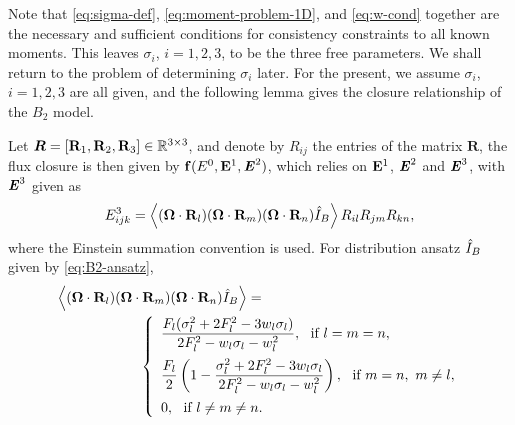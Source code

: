 Note that \eqref{eq:sigma-def}, \eqref{eq:moment-problem-1D}, and
\eqref{eq:w-cond} together are the necessary and sufficient conditions 
for consistency constraints to all known
moments. This leaves $\sigma_i$, $i=1,2,3$, to be the three free
parameters. We shall return to the problem of determining $\sigma_i$
later. For the present, we assume $\sigma_i$, $i = 1,2,3$ are all given, and the
following lemma gives the closure relationship of the $B_2$ model.
\begin{lemma}\label{lem:E3}
  Let
  $\mathrm{\boldsymbol{R}} = [\mathbf{R}_1, \mathbf{R}_2, \mathbf{R}_3] \in \mathbb{R}^{3\times
    3}$,
  and denote by $R_{ij}$ the entries of the matrix
  $\mathrm{\boldsymbol{R}}$, the flux closure is then given by
  $\mathbf{f}(E^0, \mathbf{E}^1, \boldsymbol{\mathit{E}}^2)$, which relies on $\mathbf{E}^1$, $\boldsymbol{\mathit{E}}^2$ and
  $\boldsymbol{\mathit{E}}^3$, with $\boldsymbol{\mathit{E}}^3$ given as
\[
E^3_{ijk} =   \left\langle  (\boldsymbol{\Omega}\cdot\mathbf{R}_l)
  (\boldsymbol{\Omega}\cdot\mathbf{R}_m)
  (\boldsymbol{\Omega}\cdot\mathbf{R}_n) \hat I_B \right\rangle
R_{il} R_{jm} R_{kn},
\]
where the Einstein summation convention is used.
  For distribution ansatz $\hat I_B$ given by \eqref{eq:B2-ansatz},
  \begin{equation}\label{eq:B2-closure}
    \begin{aligned}
      &\Vint{ (\bOmega\cdot\bR_l) (\bOmega\cdot\bR_m)
    (\bOmega\cdot\bR_n) \bansatz} = \\ & \qquad \qquad \qquad \left
      \{
        \begin{array}{l}
          \dfrac{ F_l (\sigma_l^2 
          + 2 F_l^2 - 3 w_l \sigma_l)}
          {2 F_l^2 - w_l \sigma_l - w_l^2},
          ~~\text{if } l = m = n,\\ [4mm]
          \dfrac{ F_l }{2}\left(1-
            \dfrac{ \sigma_l^2 
            + 2 F_l^2 - 3 w_l \sigma_l }
            { 2 F_l^2 - w_l \sigma_l - w_l^2 }
          \right),~~\text{if }m=n,~m\not=l,\\ [4mm]
          0,~~\text{if}~l\not=m\not=n.
        \end{array}\right.
      \end{aligned}
    \end{equation}
  \end{lemma}
